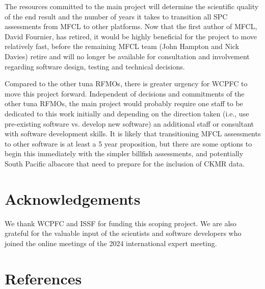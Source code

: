 \documentclass{SCreport}
\begin{document}
The resources committed to the main project will determine the scientific
quality of the end result and the number of years it takes to transition all SPC
assessments from MFCL to other platforms. Now that the first author of MFCL,
David Fournier, has retired, it would be highly beneficial for the project to
move relatively fast, before the remaining MFCL team (John Hampton and Nick
Davies) retire and will no longer be available for consultation and involvement
regarding software design, testing and technical decisions.

Compared to the other tuna RFMOs, there is greater urgency for WCPFC to move
this project forward. Independent of decisions and commitments of the other tuna
RFMOs, the main project would probably require one staff to be dedicated to this
work initially and depending on the direction taken (i.e., use pre-existing
software vs. develop new software) an additional staff or consultant with
software development skills. It is likely that transitioning MFCL assessments to
other software is at least a 5 year proposition, but there are some options to
begin this immediately with the simpler billfish assessments, and potentially
South Pacific albacore that need to prepare for the inclusion of CKMR data.

\section{Acknowledgements}

We thank WCPFC and ISSF for funding this scoping project. We are also grateful
for the valuable input of the scientists and software developers who joined the
online meetings of the 2024 international expert meeting.

\section{References}

\sloppy\setlength{}
\end{document}
